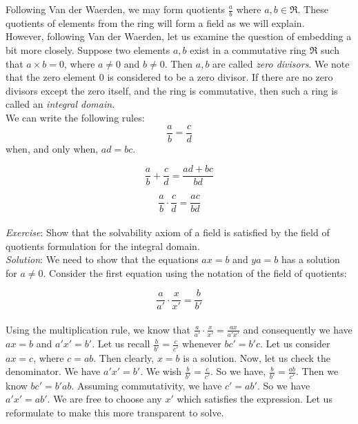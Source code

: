 Following Van der Waerden, we may form quotients $\frac{a}{b}$ where $a,b \in \mathfrak{R}$.  These quotients of elements from the ring will form a field as we will explain.\\

However, following Van der Waerden, let us examine the question of embedding a bit more closely.  Suppose two elements $a,b$ exist in a commutative ring $\mathfrak{R}$ such that $a \times b = 0$, where $a \ne 0$ and $b \ne 0$.  Then $a,b$ are called \textit{zero divisors}.  We note that the zero element $0$ is considered to be a zero divisor.  If there are no zero divisors except the zero itself, and the ring is commutative, then such a ring is called an \textit{integral domain}.\\

We can write the following rules:\\

\begin{displaymath}
\frac{a}{b}=\frac{c}{d}
\end{displaymath}
when, and only when, $ad=bc$.

\begin{displaymath}
\frac{a}{b}+\frac{c}{d}=\frac{ad+bc}{bd}
\end{displaymath}

\begin{displaymath}
\frac{a}{b} \cdot \frac{c}{d}=\frac{ac}{bd}
\end{displaymath}\\

\textit{Exercise}: Show that the solvability axiom of a field is satisfied by the field of quotients formulation for the integral domain.\\

\textit{Solution}: We need to show that the equations $ax=b$ and $ya=b$ has a solution for $a \ne 0$.  Consider the first equation using the notation of the field of quotients:

\begin{displaymath}
\frac{a}{a'} \cdot \frac{x}{x'}=\frac{b}{b'}
\end{displaymath}\\

Using the multiplication rule, we know that $\frac{a}{a'} \cdot \frac{x}{x'}=\frac{ax}{a'x'}$ and consequently we have $ax=b$ and $a'x'=b'$.  Let us recall $\frac{b}{b'}=\frac{c}{c'}$ whenever $bc'=b'c$.  Let us consider $ax=c$, where $c=ab$.  Then clearly, $x=b$ is a solution.  Now, let us check the denominator.  We have $a'x'=b'$.  We wish $\frac{b}{b'}=\frac{c}{c'}$.  So we have, $\frac{b}{b'}=\frac{ab}{c'}$.  Then we know $bc'=b'ab$.  Assuming commutativity, we have $c'=ab'$.  So we have $a'x'=ab'$.  We are free to choose any $x'$ which satisfies the expression.  Let us reformulate to make this more transparent to solve.\\

